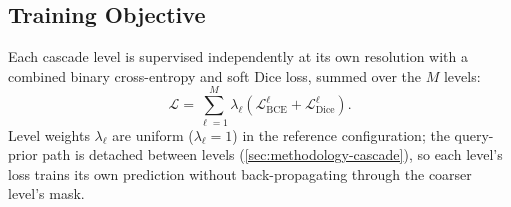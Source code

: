 \subsection{Training Objective}\label{sec:methodology-objective}

Each cascade level is supervised independently at its own resolution with
a combined binary cross-entropy and soft Dice loss, summed over the $M$
levels:
%
\begin{equation}
  \mathcal{L} = \sum_{\ell=1}^{M} \lambda_\ell \left( \mathcal{L}_{\text{BCE}}^\ell + \mathcal{L}_{\text{Dice}}^\ell \right).
\end{equation}
%
Level weights $\lambda_\ell$ are uniform ($\lambda_\ell{=}1$) in the
reference configuration; the query-prior path is detached between levels
(\autoref{sec:methodology-cascade}), so each level's loss trains its own
prediction without back-propagating through the coarser level's mask.
